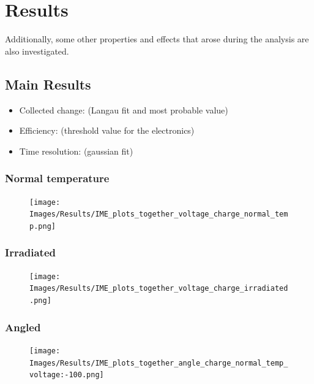 \chapter{Results}


Additionally, some other properties and effects that arose during the analysis are also investigated.
\section{Main Results}

\begin{itemize}
    \item Collected change: (Langau fit and most probable value)
    \item Efficiency: (threshold value for the electronics)
    \item Time resolution: (gaussian fit)
\end{itemize}

\subsection{Normal temperature}

\begin{figure}[!ht]
    \centering
    \texttt{[image: Images/Results/IME\_plots\_together\_voltage\_charge\_normal\_temp.png]}
    \caption{}
    \label{fig:normal_temp_IME}
\end{figure}


\subsection{Irradiated}

\begin{figure}[!ht]
    \centering
    \texttt{[image: Images/Results/IME\_plots\_together\_voltage\_charge\_irradiated.png]}
    \caption{}
    \label{fig:irradiated_IME}
\end{figure}


\subsection{Angled}

\begin{figure}[!hb]
    \centering
    \texttt{[image: Images/Results/IME\_plots\_together\_angle\_charge\_normal\_temp\_voltage:-100.png]}
    \caption{}
    \label{fig:angled_IME}
\end{figure}




